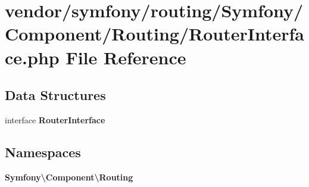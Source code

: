 \section{vendor/symfony/routing/\+Symfony/\+Component/\+Routing/\+Router\+Interface.php File Reference}
\label{_router_interface_8php}
\subsection*{Data Structures}
\begin{DoxyCompactItemize}
\item 
interface {\bf Router\+Interface}
\end{DoxyCompactItemize}
\subsection*{Namespaces}
\begin{DoxyCompactItemize}
\item 
 {\bf Symfony\textbackslash{}\+Component\textbackslash{}\+Routing}
\end{DoxyCompactItemize}
